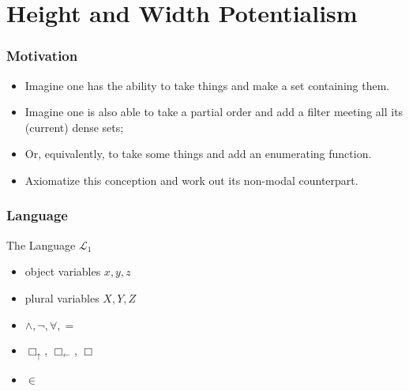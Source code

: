 \documentclass[handout]{beamer}
\newcommand{\bu}{\Box_\uparrow}
\newcommand{\bl}{\Box_\leftarrow}
\begin{document}
\section{Height and Width Potentialism}
\begin{frame}
    \frametitle{Motivation}
    \begin{itemize}
        \item<2->   Imagine one has the ability to take things and 
                    make a set containing them.
        \item<3->   Imagine one is also able to take a partial order and add a filter 
                    meeting all its (current) dense sets; 
        \item<4->   Or, equivalently, to take some things and add an enumerating function.
        \item<5->   Axiomatize this conception and work out its non-modal counterpart.
    \end{itemize}
\end{frame}
\begin{frame}
    \frametitle{Language}
    \begin{block}{The Language $\mathcal{L}_1$}
        \begin{itemize}
            \item object variables $x, y, z$
            \item<2-> plural variables $X, Y, Z$
            \item<3-> $\wedge, \neg, \forall, =$
            \item<4-> $\bu$, $\bl$, $\Box$
            \item<5-> $\in$
        \end{itemize} 
    \end{block}
\end{frame}
\end{document}
